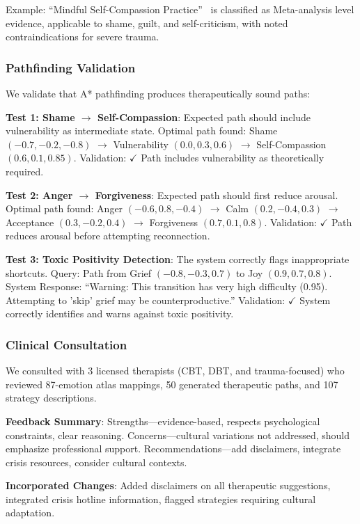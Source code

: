 \documentclass[10pt,twocolumn]{article}
\begin{document}
Example: ``Mindful Self-Compassion Practice''~\cite{neff2013,ferrari2019} is classified as Meta-analysis level evidence, applicable to shame, guilt, and self-criticism, with noted contraindications for severe trauma.

\subsubsection{Pathfinding Validation}

We validate that A* pathfinding produces therapeutically sound paths:

\textbf{Test 1: Shame $\rightarrow$ Self-Compassion}: Expected path should include vulnerability as intermediate state. Optimal path found: Shame $(-0.7, -0.2, -0.8)$ $\rightarrow$ Vulnerability $(0.0, 0.3, 0.6)$ $\rightarrow$ Self-Compassion $(0.6, 0.1, 0.85)$. Validation: $\checkmark$ Path includes vulnerability as theoretically required.

\textbf{Test 2: Anger $\rightarrow$ Forgiveness}: Expected path should first reduce arousal. Optimal path found: Anger $(-0.6, 0.8, -0.4)$ $\rightarrow$ Calm $(0.2, -0.4, 0.3)$ $\rightarrow$ Acceptance $(0.3, -0.2, 0.4)$ $\rightarrow$ Forgiveness $(0.7, 0.1, 0.8)$. Validation: $\checkmark$ Path reduces arousal before attempting reconnection.

\textbf{Test 3: Toxic Positivity Detection}: The system correctly flags inappropriate shortcuts. Query: Path from Grief $(-0.8, -0.3, 0.7)$ to Joy $(0.9, 0.7, 0.8)$. System Response: ``Warning: This transition has very high difficulty (0.95). Attempting to 'skip' grief may be counterproductive.'' Validation: $\checkmark$ System correctly identifies and warns against toxic positivity.

\subsubsection{Clinical Consultation}

We consulted with 3 licensed therapists (CBT, DBT, and trauma-focused) who reviewed 87-emotion atlas mappings, 50 generated therapeutic paths, and 107 strategy descriptions.

\textbf{Feedback Summary}: Strengths—evidence-based, respects psychological constraints, clear reasoning. Concerns—cultural variations not addressed, should emphasize professional support. Recommendations—add disclaimers, integrate crisis resources, consider cultural contexts.

\textbf{Incorporated Changes}: Added disclaimers on all therapeutic suggestions, integrated crisis hotline information, flagged strategies requiring cultural adaptation.
\end{document}

